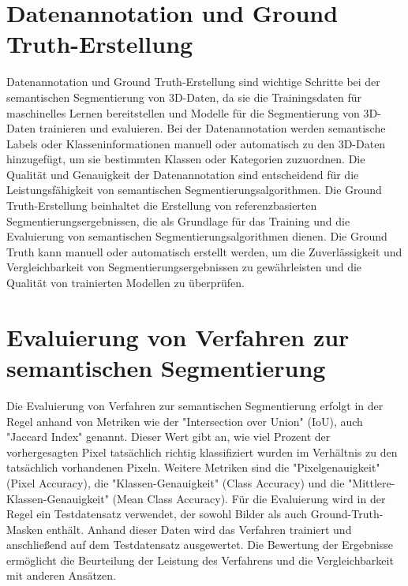 \section{Datenannotation und Ground Truth-Erstellung}

Datenannotation und Ground Truth-Erstellung sind wichtige Schritte bei der
semantischen Segmentierung von 3D-Daten, da sie die Trainingsdaten für
maschinelles Lernen bereitstellen und Modelle für die Segmentierung von
3D-Daten trainieren und evaluieren. Bei der Datenannotation werden semantische
Labels oder Klasseninformationen manuell oder automatisch zu den 3D-Daten
hinzugefügt, um sie bestimmten Klassen oder Kategorien zuzuordnen. Die Qualität
und Genauigkeit der Datenannotation sind entscheidend für die
Leistungsfähigkeit von semantischen Segmentierungsalgorithmen. Die Ground
Truth-Erstellung beinhaltet die Erstellung von referenzbasierten
Segmentierungsergebnissen, die als Grundlage für das Training und die
Evaluierung von semantischen Segmentierungsalgorithmen dienen. Die Ground Truth
kann manuell oder automatisch erstellt werden, um die Zuverlässigkeit und
Vergleichbarkeit von Segmentierungsergebnissen zu gewährleisten und die
Qualität von trainierten Modellen zu überprüfen.

\section{Evaluierung von Verfahren zur semantischen Segmentierung}
Die Evaluierung von Verfahren zur semantischen Segmentierung erfolgt in der
Regel anhand von Metriken wie der "Intersection over Union" (IoU), auch
"Jaccard Index" genannt. Dieser Wert gibt an, wie viel Prozent der
vorhergesagten Pixel tatsächlich richtig klassifiziert wurden im Verhältnis zu
den tatsächlich vorhandenen Pixeln. Weitere Metriken sind die
"Pixelgenauigkeit" (Pixel Accuracy), die "Klassen-Genauigkeit" (Class Accuracy)
und die "Mittlere-Klassen-Genauigkeit" (Mean Class Accuracy). Für die
Evaluierung wird in der Regel ein Testdatensatz verwendet, der sowohl Bilder
als auch Ground-Truth-Masken enthält. Anhand dieser Daten wird das Verfahren
trainiert und anschließend auf dem Testdatensatz ausgewertet. Die Bewertung der
Ergebnisse ermöglicht die Beurteilung der Leistung des Verfahrens und die
Vergleichbarkeit mit anderen Ansätzen.